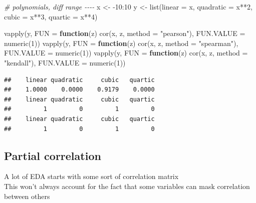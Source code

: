 \documentclass[
]{krantz}
\makeatletter
\newenvironment{Shaded}{\begin{snugshade}}{\end{snugshade}}
\newcommand{\AttributeTok}[1]{\textcolor[rgb]{0.61,0.61,0.61}{#1}}
\newcommand{\CommentTok}[1]{\textcolor[rgb]{0.37,0.37,0.37}{\textit{#1}}}
\newcommand{\ControlFlowTok}[1]{\textcolor[rgb]{0.27,0.27,0.27}{\textbf{#1}}}
\newcommand{\DecValTok}[1]{\textcolor[rgb]{0.06,0.06,0.06}{#1}}
\newcommand{\FunctionTok}[1]{\textcolor[rgb]{0,0,0}{#1}}
\newcommand{\NormalTok}[1]{#1}
\newcommand{\OtherTok}[1]{\textcolor[rgb]{0.37,0.37,0.37}{#1}}
\newcommand{\SpecialCharTok}[1]{\textcolor[rgb]{0,0,0}{#1}}
\newcommand{\StringTok}[1]{\textcolor[rgb]{0.5,0.5,0.5}{#1}}
\newenvironment{kframe}{%
\medskip{}
\setlength{\fboxsep}{.8em}
 \def\at@end@of@kframe{}%
 \ifinner\ifhmode%
  \def\at@end@of@kframe{\end{minipage}}%
  \begin{minipage}{\columnwidth}%
 \fi\fi%
 \def\FrameCommand##1{\hskip\@totalleftmargin \hskip-\fboxsep
 \colorbox{shadecolor}{##1}\hskip-\fboxsep
     \hskip-\linewidth \hskip-\@totalleftmargin \hskip\columnwidth}%
 \MakeFramed {\advance\hsize-\width
   \@totalleftmargin\z@ \linewidth\hsize
   \@setminipage}}%
 {\par\unskip\endMakeFramed%
 \at@end@of@kframe}
\renewenvironment{Shaded}{\begin{kframe}}{\end{kframe}}
\makeatother
\begin{document}
\begin{Shaded}
\begin{Highlighting}[]
\CommentTok{\# polynomials, diff range {-}{-}{-}{-}}
\NormalTok{x }\OtherTok{\textless{}{-}} \SpecialCharTok{{-}}\DecValTok{10}\SpecialCharTok{:}\DecValTok{10}
\NormalTok{y }\OtherTok{\textless{}{-}} \FunctionTok{list}\NormalTok{(}\AttributeTok{linear =}\NormalTok{ x, }\AttributeTok{quadratic =}\NormalTok{ x}\SpecialCharTok{**}\DecValTok{2}\NormalTok{, }\AttributeTok{cubic =}\NormalTok{ x}\SpecialCharTok{**}\DecValTok{3}\NormalTok{, }\AttributeTok{quartic =}\NormalTok{ x}\SpecialCharTok{**}\DecValTok{4}\NormalTok{)}

\FunctionTok{vapply}\NormalTok{(y, }\AttributeTok{FUN =} \ControlFlowTok{function}\NormalTok{(z) }\FunctionTok{cor}\NormalTok{(x, z, }\AttributeTok{method =} \StringTok{"pearson"}\NormalTok{), }\AttributeTok{FUN.VALUE =} \FunctionTok{numeric}\NormalTok{(}\DecValTok{1}\NormalTok{))}
\FunctionTok{vapply}\NormalTok{(y, }\AttributeTok{FUN =} \ControlFlowTok{function}\NormalTok{(z) }\FunctionTok{cor}\NormalTok{(x, z, }\AttributeTok{method =} \StringTok{"spearman"}\NormalTok{), }\AttributeTok{FUN.VALUE =} \FunctionTok{numeric}\NormalTok{(}\DecValTok{1}\NormalTok{))}
\FunctionTok{vapply}\NormalTok{(y, }\AttributeTok{FUN =} \ControlFlowTok{function}\NormalTok{(z) }\FunctionTok{cor}\NormalTok{(x, z, }\AttributeTok{method =} \StringTok{"kendall"}\NormalTok{), }\AttributeTok{FUN.VALUE =} \FunctionTok{numeric}\NormalTok{(}\DecValTok{1}\NormalTok{))}
\end{Highlighting}
\end{Shaded}

\begin{verbatim}
##    linear quadratic     cubic   quartic 
##    1.0000    0.0000    0.9179    0.0000 
##    linear quadratic     cubic   quartic 
##         1         0         1         0 
##    linear quadratic     cubic   quartic 
##         1         0         1         0
\end{verbatim}

\hypertarget{partial-correlation}{%
\subsection{Partial correlation}\label{partial-correlation}}

A lot of EDA starts with some sort of correlation matrix\\
This won't always account for the fact that some variables can mask correlation between others
\end{document}

